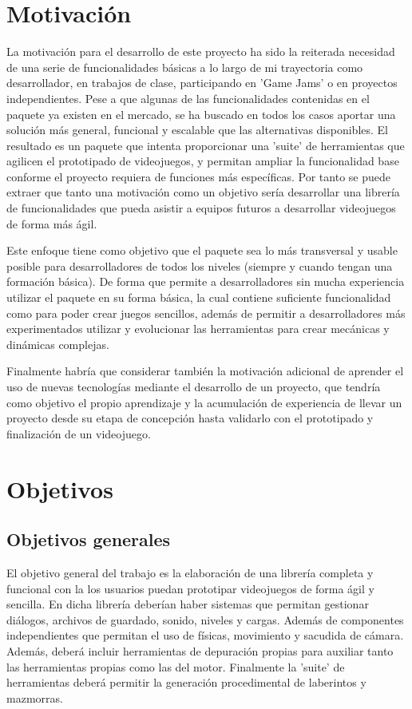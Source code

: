 \section{Motivación}

La motivación para el desarrollo de este proyecto ha sido la reiterada necesidad de una serie de funcionalidades básicas a lo largo de mi trayectoria como desarrollador,
 en trabajos de clase, participando en 'Game Jams' o en proyectos independientes. Pese a que algunas de las funcionalidades contenidas en el paquete ya existen en el mercado,
 se ha buscado en todos los casos aportar una solución más general, funcional y escalable que las alternativas disponibles. El resultado es un paquete que intenta proporcionar
 una 'suite' de herramientas que agilicen el prototipado de videojuegos, y permitan ampliar la funcionalidad base conforme el proyecto requiera de funciones más específicas. 
 Por tanto se puede extraer que tanto una motivación como un objetivo sería desarrollar una librería de funcionalidades que pueda asistir a equipos futuros a desarrollar
 videojuegos de forma más ágil.

Este enfoque tiene como objetivo que el paquete sea lo más transversal y usable posible para desarrolladores de todos los niveles (siempre y cuando tengan una formación básica).
 De forma que permite a desarrolladores sin mucha experiencia utilizar el paquete en su forma básica, la cual contiene suficiente funcionalidad como para poder crear juegos
 sencillos, además de permitir a desarrolladores más experimentados utilizar y evolucionar las herramientas para crear mecánicas y dinámicas complejas.
 
 Finalmente habría que considerar también la motivación adicional de aprender el uso de nuevas tecnologías mediante el desarrollo de un proyecto, que tendría como objetivo el
  propio aprendizaje y la acumulación de experiencia de llevar un proyecto desde su etapa de concepción hasta validarlo con el prototipado y finalización de un videojuego. 

\section{Objetivos}
\subsection{Objetivos generales}
El objetivo general del trabajo es la elaboración de una librería completa y funcional con la los usuarios puedan prototipar videojuegos de forma ágil y sencilla. 
 En dicha librería deberían haber sistemas que permitan gestionar diálogos, archivos de guardado, sonido, niveles y cargas. Además de componentes independientes que permitan 
 el uso de físicas, movimiento y sacudida de cámara. Además, deberá incluir herramientas de depuración propias para auxiliar tanto las herramientas propias como las del motor. 
 Finalmente la 'suite' de herramientas deberá permitir la generación procedimental de laberintos y mazmorras.

